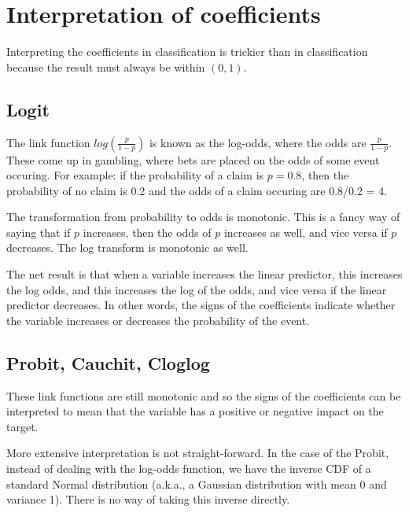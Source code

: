 \documentclass[
  openany]{book}
\begin{document}
\hypertarget{interpretation-of-coefficients-1}{%
\section{Interpretation of coefficients}\label{interpretation-of-coefficients-1}}

Interpreting the coefficients in classification is trickier than in classification because the result must always be within \((0,1)\).

\hypertarget{logit}{%
\subsection{Logit}\label{logit}}

The link function \(log(\frac{p}{1-p})\) is known as the log-odds, where the odds are \(\frac{p}{1-p}\). These come up in gambling, where bets are placed on the odds of some event occuring. For example: if the probability of a claim is \(p = 0.8\), then the probability of no claim is 0.2 and the odds of a claim occuring are 0.8/0.2 = 4.

The transformation from probability to odds is monotonic. This is a fancy way of saying that if \(p\) increases, then the odds of \(p\) increases as well, and vice versa if \(p\) decreases. The log transform is monotonic as well.

The net result is that when a variable increases the linear predictor, this increases the log odds, and this increases the log of the odds, and vice versa if the linear predictor decreases. In other words, the signs of the coefficients indicate whether the variable increases or decreases the probability of the event.

\hypertarget{probit-cauchit-cloglog}{%
\subsection{Probit, Cauchit, Cloglog}\label{probit-cauchit-cloglog}}

These link functions are still monotonic and so the signs of the coefficients can be interpreted to mean that the variable has a positive or negative impact on the target.

More extensive interpretation is not straight-forward. In the case of the Probit, instead of dealing with the log-odds function, we have the inverse CDF of a standard Normal distribution (a.k.a., a Gaussian distribution with mean 0 and variance 1). There is no way of taking this inverse directly.
\end{document}
